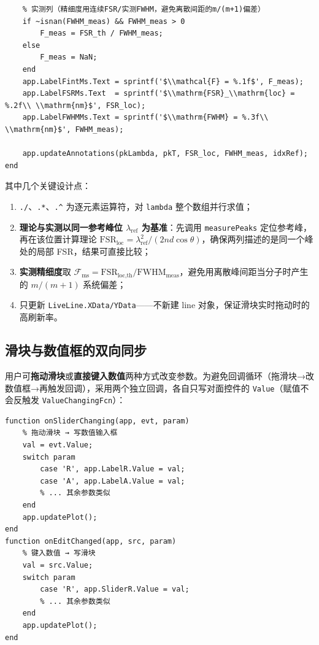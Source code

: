 \documentclass[10.5pt]{config}
\begin{document}
\begin{listing}[H]
\begin{verbatim}
    % 实测列（精细度用连续FSR/实测FWHM，避免离散间距的m/(m+1)偏差）
    if ~isnan(FWHM_meas) && FWHM_meas > 0
        F_meas = FSR_th / FWHM_meas;
    else
        F_meas = NaN;
    end
    app.LabelFintMs.Text = sprintf('$\\mathcal{F} = %.1f$', F_meas);
    app.LabelFSRMs.Text  = sprintf('$\\mathrm{FSR}_\\mathrm{loc} = %.2f\\ \\mathrm{nm}$', FSR_loc);
    app.LabelFWHMMs.Text = sprintf('$\\mathrm{FWHM} = %.3f\\ \\mathrm{nm}$', FWHM_meas);

    app.updateAnnotations(pkLambda, pkT, FSR_loc, FWHM_meas, idxRef);
end
\end{verbatim}
\caption{\texttt{updatePlot}：向量化计算透过率、统一以参考峰位更新理论/实测双列特征值与几何标注}
\end{listing}

\noindent 其中几个关键设计点：
\begin{enumerate}
    \item \texttt{./}、\texttt{.*}、\texttt{.\^{}} 为逐元素运算符，对 \texttt{lambda} 整个数组并行求值；
    \item \textbf{理论与实测以同一参考峰位 $\lambda_\text{ref}$ 为基准}：先调用 \texttt{measurePeaks} 定位参考峰，再在该位置计算理论 $\mathrm{FSR}_\text{loc}=\lambda_\text{ref}^2/(2nd\cos\theta)$，确保两列描述的是同一个峰处的局部 FSR，结果可直接比较；
    \item \textbf{实测精细度}取 $\mathcal{F}_\text{ms}=\mathrm{FSR}_\text{loc,th}/\mathrm{FWHM}_\text{meas}$，避免用离散峰间距当分子时产生的 $m/(m+1)$ 系统偏差；
    \item 只更新 \texttt{LiveLine.XData/YData}——不新建 line 对象，保证滑块实时拖动时的高刷新率。
\end{enumerate}

\subsection{滑块与数值框的双向同步}

用户可\textbf{拖动滑块}或\textbf{直接键入数值}两种方式改变参数。为避免回调循环（拖滑块→改数值框→再触发回调），采用两个独立回调，各自只写对面控件的 \texttt{Value}（赋值不会反触发 \texttt{ValueChangingFcn}）：

\begin{listing}[H]
\begin{verbatim}
function onSliderChanging(app, evt, param)
    % 拖动滑块 → 写数值输入框
    val = evt.Value;
    switch param
        case 'R', app.LabelR.Value = val;
        case 'A', app.LabelA.Value = val;
        % ... 其余参数类似
    end
    app.updatePlot();
end
function onEditChanged(app, src, param)
    % 键入数值 → 写滑块
    val = src.Value;
    switch param
        case 'R', app.SliderR.Value = val;
        % ... 其余参数类似
    end
    app.updatePlot();
end
\end{verbatim}
\caption{双向同步的两个回调函数}
\end{listing}
\end{document}
